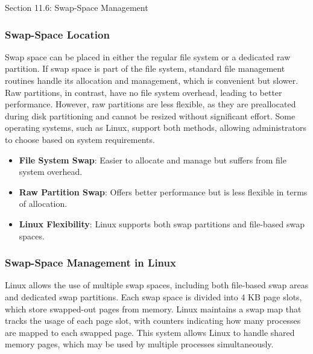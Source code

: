 \begin{notes}{Section 11.6: Swap-Space Management}
\begin{highlight}
    \end{highlight}
    
    \subsubsection*{Swap-Space Location}
    
    Swap space can be placed in either the regular file system or a dedicated raw partition. If swap space is part of the file system, standard file management routines handle its allocation and management, 
    which is convenient but slower. Raw partitions, in contrast, have no file system overhead, leading to better performance. However, raw partitions are less flexible, as they are preallocated during disk 
    partitioning and cannot be resized without significant effort. Some operating systems, such as Linux, support both methods, allowing administrators to choose based on system requirements.
    
    \begin{highlight}
    
        \begin{itemize}
            \item \textbf{File System Swap}: Easier to allocate and manage but suffers from file system overhead.
            \item \textbf{Raw Partition Swap}: Offers better performance but is less flexible in terms of allocation.
            \item \textbf{Linux Flexibility}: Linux supports both swap partitions and file-based swap spaces.
        \end{itemize}
    
    \end{highlight}
    
    \subsubsection*{Swap-Space Management in Linux}
    
    Linux allows the use of multiple swap spaces, including both file-based swap areas and dedicated swap partitions. Each swap space is divided into 4 KB page slots, which store swapped-out pages from 
    memory. Linux maintains a swap map that tracks the usage of each page slot, with counters indicating how many processes are mapped to each swapped page. This system allows Linux to handle shared 
    memory pages, which may be used by multiple processes simultaneously.
    

\end{notes}
